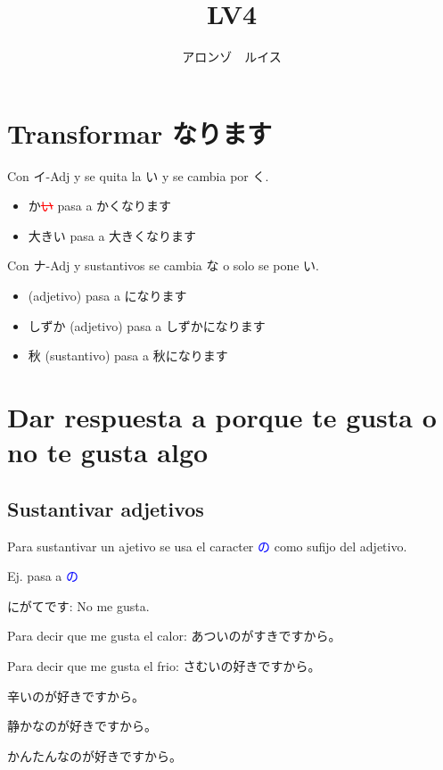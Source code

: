 \documentclass[a4paper,lualatex,ja=standard,base=10pt]{bxjsarticle}
\title{\ruby{第|０３|課}{だい||か} LV4}
\author{アロンゾ　ルイス}
\newcommand{\rmv}[1]{\textcolor{red}{\sout{#1}}}
\begin{document}
\setcounter{page}{1}

\maketitle{}
\thispagestyle{fancy}
\section{Transformar なります}

Con イ-Adj y se quita la い y se cambia por く.

\begin{itemize}
  \item {}か\rmv{い} pasa a かくなります
  \item 大きい pasa a 大きくなります
\end{itemize}

Con ナ-Adj y sustantivos se cambia な o solo se pone い.

\begin{itemize}
  \item {}(adjetivo) pasa a になります
  \item しずか (adjetivo) pasa a しずかになります
  \item 秋 (sustantivo) pasa a 秋になります
\end{itemize}

\section{Dar respuesta a porque te gusta o no te gusta algo}

\subsection{Sustantivar adjetivos}

Para sustantivar un ajetivo se usa el caracter \textcolor{blue}{の} como
sufijo del adjetivo.

Ej.  pasa a \textcolor{blue}{の}

にがてです: No me gusta.

Para decir que me gusta el calor: あついのがすきですから。

Para decir que me gusta el frio: さむいの好きですから。

辛いのが好きですから。

静かなのが好きですから。

かんたんなのが好きですから。
\end{document}
